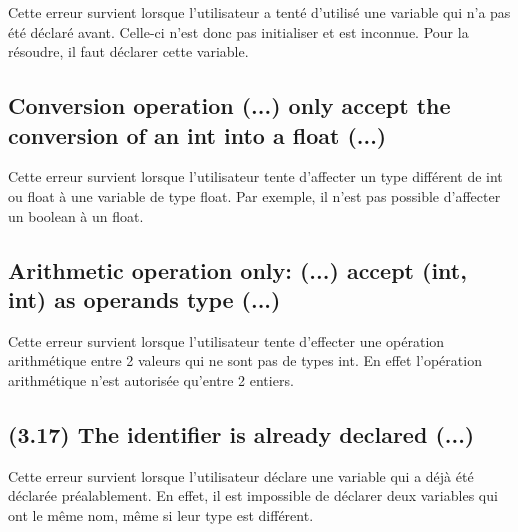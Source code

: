 \documentclass[12pt, a4paper, one side]{article}
\begin{document}
Cette erreur survient lorsque l'utilisateur a tenté d'utilisé une variable qui n'a pas été déclaré avant. Celle-ci n'est donc
pas initialiser et est inconnue. Pour la résoudre, il faut déclarer cette variable.

\subsection{Conversion operation (...) only accept the conversion of an int into a float (...)}

Cette erreur survient lorsque l'utilisateur tente d'affecter un type différent de int ou float à une variable de type float. Par exemple, il n'est pas possible d'affecter un boolean à un float.

\subsection{Arithmetic operation only: (...) accept (int, int) as operands type (...)}

Cette erreur survient lorsque l'utilisateur tente d'effecter une opération arithmétique entre 2 valeurs qui ne sont pas de types int. En effet l'opération arithmétique n'est autorisée qu'entre 2 entiers.

\subsection{(3.17) The identifier is already declared (...)}

Cette erreur survient lorsque l'utilisateur déclare une variable qui a déjà été déclarée préalablement. En effet, il est impossible de déclarer deux variables qui ont le même nom, même si leur type est différent.
\end{document}
